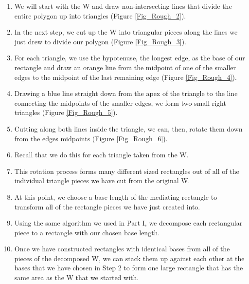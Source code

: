 \documentclass{article}
\begin{document}
\begin{enumerate}

    \item We will start with the W and draw non-intersecting lines that divide the entire polygon up into triangles (Figure \ref{Fig_Rough_2}).

    \item In the next step, we cut up the W into triangular pieces along the lines we just drew to divide our polygon (Figure \ref{Fig_Rough_3}).
    
    \item For each triangle, we use the hypotenuse, the longest edge, as the base of our rectangle and draw an orange line from the midpoint of one of the smaller edges to the midpoint of the last remaining edge (Figure \ref{Fig_Rough_4}).
    
    \item Drawing a blue line straight down from the apex of the triangle to the line connecting the midpoints of the smaller edges, we form two small right triangles (Figure \ref{Fig_Rough_5}).
    
    \item Cutting along both lines inside the triangle, we can, then, rotate them down from the edges midpoints (Figure \ref{Fig_Rough_6}).
    
    \item Recall that we do this for each triangle taken from the W.
    \item This rotation process forms many different sized rectangles out of all of the individual triangle pieces we have cut from the original W.
    
    \item At this point, we choose a base length of the mediating rectangle to transform all of the rectangle pieces we have just created into.
    
    \item Using the same algorithm we used in Part I, we decompose each rectangular piece to a rectangle with our chosen base length.
    
    \item Once we have constructed rectangles with identical bases from all of the pieces of the decomposed W, we can stack them up against each other at the bases that we have chosen in Step 2 to form one large rectangle that has the same area as the W that we started with.
    

\end{enumerate}
\end{document}

